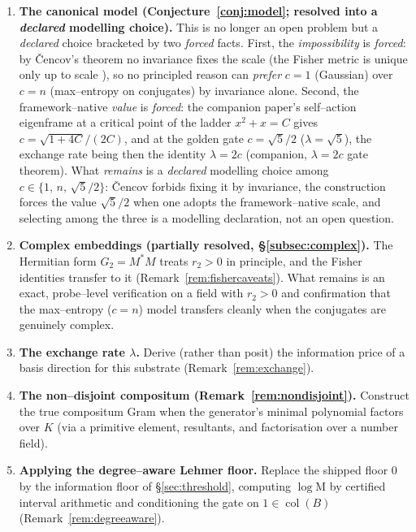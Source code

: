 \documentclass[11pt]{article}
\theoremstyle{plain}
\theoremstyle{definition}
\theoremstyle{remark}
\newcommand{\K}{K}
\newcommand{\Mah}{\mathrm{M}}
\newcommand{\BB}{B}
\DeclareMathOperator{\col}{col}
\begin{document}
\begin{enumerate}[label=(O\arabic*),leftmargin=*]
  \item \textbf{The canonical model (Conjecture~\ref{conj:model}; resolved into a \emph{declared} modelling
        choice).} This is no longer an open problem but a \emph{declared} choice bracketed by two \emph{forced}
        facts. First, the \emph{impossibility} is \emph{forced}: by \v{C}encov's theorem no invariance fixes
        the scale (the Fisher metric is unique only up to scale \cite{Cencov}), so no principled reason can
        \emph{prefer} $c=1$ (Gaussian) over $c=n$ (max--entropy on conjugates) by invariance alone. Second, the
        framework--native \emph{value} is \emph{forced}: the companion paper's self--action eigenframe at a
        critical point of the ladder $x^2+x=C$ gives $c=\sqrt{1+4C}/(2C)$, and at the golden gate
        $c=\sqrt5/2$ ($\lambda=\sqrt5$), the exchange rate being then the identity $\lambda=2c$ (companion,
        $\lambda=2c$ gate theorem). What \emph{remains} is a \emph{declared} modelling choice among
        $c\in\{1,\,n,\,\sqrt5/2\}$: \v{C}encov forbids fixing it by invariance, the construction forces the
        value $\sqrt5/2$ when one adopts the framework--native scale, and selecting among the three is a
        modelling declaration, not an open question.
  \item \textbf{Complex embeddings (partially resolved, \S\ref{subsec:complex}).} The Hermitian form
        $G_2=M^{*}M$ treats $r_2>0$ in principle, and the Fisher identities transfer to it
        (Remark~\ref{rem:fishercaveats}). What remains is an exact, probe--level verification on a field with
        $r_2>0$ and confirmation that the max--entropy ($c=n$) model transfers cleanly when the conjugates
        are genuinely complex.
  \item \textbf{The exchange rate $\lambda$.} Derive (rather than posit) the information price of a basis
        direction for this substrate (Remark~\ref{rem:exchange}).
  \item \textbf{The non--disjoint compositum (Remark~\ref{rem:nondisjoint}).} Construct the true compositum
        Gram when the generator's minimal polynomial factors over $\K$ (via a primitive element, resultants,
        and factorisation over a number field).
  \item \textbf{Applying the degree--aware Lehmer floor.} Replace the shipped floor $0$ by the
        information floor of \S\ref{sec:threshold}, computing $\log\Mah$ by certified interval arithmetic and
        conditioning the gate on $1\in\col(\BB)$ (Remark~\ref{rem:degreeaware}).
\end{enumerate}
\end{document}
